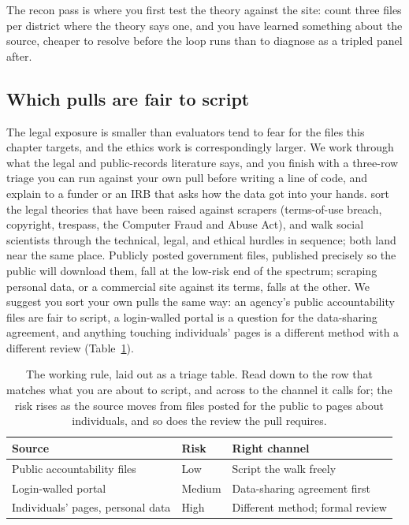 The recon pass is where you first test the theory against the site: count three files per district where the theory says one, and you have learned something about the source, cheaper to resolve before the loop runs than to diagnose as a tripled panel after.

\subsection{Which pulls are fair to script}\label{sec:ch04-legalrisk}
The legal exposure is smaller than evaluators tend to fear for the files this chapter targets, and the ethics work is correspondingly larger. We work through what the legal and public-records literature says, and you finish with a three-row triage you can run against your own pull before writing a line of code, and explain to a funder or an IRB that asks how the data got into your hands. \textcite{krotov2020legality} sort the legal theories that have been raised against scrapers (terms-of-use breach, copyright, trespass, the Computer Fraud and Abuse Act), and \textcite{luscombe2022scraping} walk social scientists through the technical, legal, and ethical hurdles in sequence; both land near the same place. Publicly posted government files, published precisely so the public will download them, fall at the low-risk end of the spectrum; scraping personal data, or a commercial site against its terms, falls at the other. We suggest you sort your own pulls the same way: an agency's public accountability files are fair to script, a login-walled portal is a question for the data-sharing agreement, and anything touching individuals' pages is a different method with a different review (Table~\ref{tab:ch04-viz-risk}).

\begin{table}[htbp]
\centering
\caption[Which channel for which source]{The working rule, laid out as a triage table. Read down to the row that matches what you are
about to script, and across to the channel it calls for; the risk rises
as the source moves from files posted for the public to pages about
individuals, and so does the review the pull requires.}
\label{tab:ch04-viz-risk}
\begin{tabular}{@{}p{4.2cm}p{1.8cm}p{8.8cm}@{}}
\toprule
Source & Risk & Right channel \\
\midrule
Public accountability files & Low & Script the walk freely \\
Login-walled portal & Medium & Data-sharing agreement first \\
Individuals' pages, personal data & High & Different method; formal review \\
\bottomrule
\end{tabular}
\end{table}

